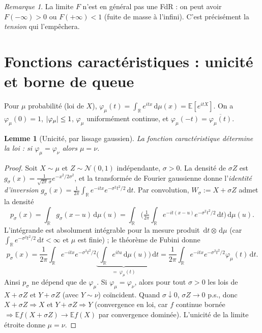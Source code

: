 \documentclass[11pt]{article}
\newcommand{\R}{\mathbb{R}}
\newcommand{\E}{\mathbb{E}}
\newcommand{\dd}{\,\mathrm{d}}
\newcommand{\weak}{\Rightarrow}
\DeclarePairedDelimiter{\abs}{\lvert}{\rvert}
\theoremstyle{plain}
\newtheorem{lemme}[theoreme]{Lemme}
\theoremstyle{definition}
\theoremstyle{remark}
\newtheorem{remarque}[theoreme]{Remarque}
\begin{document}
\begin{remarque}
La limite $F$ n'est en général pas une FdR : on peut avoir $F(-\infty)>0$ ou $F(+\infty)<1$
(fuite de masse à l'infini). C'est précisément la \emph{tension} qui l'empêchera.
\end{remarque}

\section{Fonctions caractéristiques : unicité et borne de queue}

Pour $\mu$ probabilité (loi de $X$), $\varphi_\mu(t)=\int_\R e^{itx}\dd\mu(x)=\E[e^{itX}]$.
On a $\varphi_\mu(0)=1$, $\abs{\varphi_\mu}\le1$, $\varphi_\mu$ uniformément continue, et
$\varphi_\mu(-t)=\overline{\varphi_\mu(t)}$.

\begin{lemme}[Unicité, par lissage gaussien]\label{lem:uniq}
La fonction caractéristique détermine la loi : si $\varphi_\mu=\varphi_\nu$ alors $\mu=\nu$.
\end{lemme}

\begin{proof}
Soit $X\sim\mu$ et $Z\sim\mathcal N(0,1)$ indépendante, $\sigma>0$. La densité de $\sigma Z$ est
$g_\sigma(x)=\tfrac1{\sqrt{2\pi}\,\sigma}e^{-x^2/2\sigma^2}$, et la transformée de Fourier gaussienne
donne l'\emph{identité d'inversion} $g_\sigma(x)=\tfrac1{2\pi}\int_\R e^{-itx}e^{-\sigma^2 t^2/2}\dd t$.
Par convolution, $W_\sigma:=X+\sigma Z$ admet la densité
\[
p_\sigma(x)=\int_\R g_\sigma(x-u)\dd\mu(u)
=\int_\R\Big(\tfrac1{2\pi}\int_\R e^{-it(x-u)}e^{-\sigma^2t^2/2}\dd t\Big)\dd\mu(u).
\]
L'intégrande est absolument intégrable pour la mesure produit $\dd t\otimes\dd\mu$
(car $\int_\R e^{-\sigma^2t^2/2}\dd t<\infty$ et $\mu$ est finie) ; le théorème de Fubini donne
\[
p_\sigma(x)=\frac1{2\pi}\int_\R e^{-itx}e^{-\sigma^2t^2/2}
\underbrace{\Big(\int_\R e^{itu}\dd\mu(u)\Big)}_{=\ \varphi_\mu(t)}\dd t
=\frac1{2\pi}\int_\R e^{-itx}e^{-\sigma^2t^2/2}\varphi_\mu(t)\dd t.
\]
Ainsi $p_\sigma$ ne dépend que de $\varphi_\mu$. Si $\varphi_\mu=\varphi_\nu$, alors pour tout
$\sigma>0$ les lois de $X+\sigma Z$ et $Y+\sigma Z$ (avec $Y\sim\nu$) coïncident. Quand
$\sigma\downarrow0$, $\sigma Z\to0$ p.s., donc $X+\sigma Z\weak X$ et $Y+\sigma Z\weak Y$
(convergence en loi, car $f$ continue bornée$\Rightarrow\E f(X+\sigma Z)\to\E f(X)$ par convergence
dominée). L'unicité de la limite étroite donne $\mu=\nu$.
\end{proof}
\end{document}
